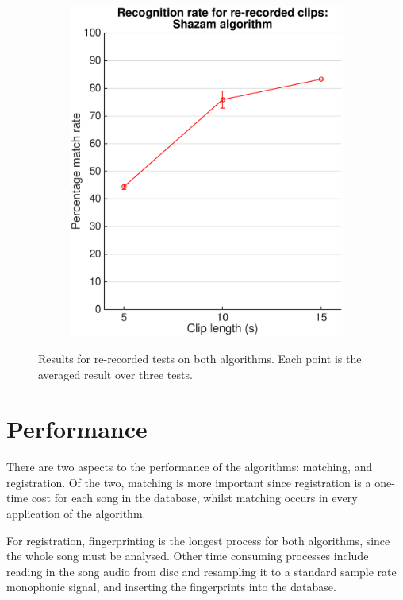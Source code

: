 \documentclass[12pt,a4paper,twoside,openright]{report}
\begin{document}
\begin{figure}[htbp!]
\begin{subfigure}{0.5\textwidth}
     	\includegraphics[width=0.95\linewidth]{./figs/constellation_passthrough.eps} 
    \end{subfigure}

    \caption{Results for re-recorded tests on both algorithms. Each point is the averaged result over three tests.}
    \label{fig:re-recorded_results}
\end{figure}

\section{Performance}

There are two aspects to the performance of the algorithms: matching, and registration. Of the two, matching is more important since registration is a one-time cost for each song in the database, whilst matching occurs in every application of the algorithm.

For registration, fingerprinting is the longest process for both algorithms, since the whole song must be analysed. Other time consuming processes include reading in the song audio from disc and resampling it to a standard sample rate monophonic signal, and inserting the fingerprints into the database.
\end{document}
